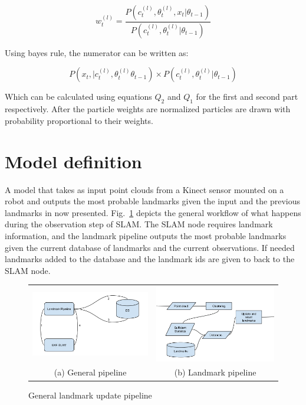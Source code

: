 \documentclass[twoside,hidelinks]{article}
\begin{document}
\begin{equation}
w_t^{(l)} = \frac {P(c_t^{(l)} , \theta_t^{(l)}, x_t| 	\theta_{t-1} )}{P(c_t^{(l)} , \theta_t^{(l)}| 	\theta_{t-1} )}
\end{equation}

Using bayes rule, the numerator can be written as:

\begin{equation}
	P(x_t , | c_t^{(l)} , \theta_t^{(l)} \theta_{t-1} ) \times P(c_t^{(l)} , \theta_t^{(l)}|  \theta_{t-1} )
\end{equation}

Which can be calculated using equations $Q_2$ and $Q_1$ for the first and second part respectively. After the particle weights are normalized particles are drawn with probability proportional to their weights.
\section{Model definition}
\label{sec:model}

A model that takes as input point clouds from a Kinect sensor mounted on a robot and outputs the most probable landmarks given the input and the previous landmarks in now presented. Fig.~\ref{pipeline} depicts the general workflow of what happens during the observation step of SLAM. The SLAM node requires landmark information, and the landmark pipeline outputs the most probable landmarks given the current database of landmarks and the current observations. If needed landmarks added to the database and the landmark ids are given to back to the SLAM node.


\begin{figure}
\begin{tabular}{cc}
  \includegraphics[width=65mm]{workflowGen} &    \includegraphics[width=65mm]{workflowSpec} \\
(a) General pipeline & (b) Landmark pipeline \\[6pt]
\end{tabular}
\caption{General landmark update pipeline}
\label{pipeline}
\end{figure}
\end{document}
